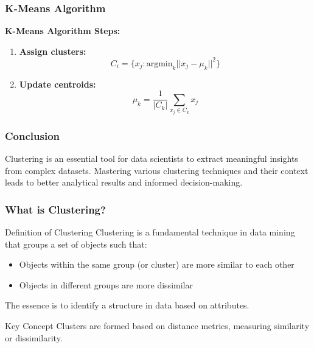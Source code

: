 \documentclass[aspectratio=169]{beamer}
\begin{document}
\begin{frame}[fragile]
    \frametitle{K-Means Algorithm}
    \textbf{K-Means Algorithm Steps:}
    \begin{enumerate}
        \item \textbf{Assign clusters:}
        \begin{equation}
            C_i = \{ x_j : \text{argmin}_{k} || x_j - \mu_k ||^2 \}
        \end{equation}
        \item \textbf{Update centroids:}
        \begin{equation}
            \mu_k = \frac{1}{|C_k|} \sum_{x_j \in C_k} x_j
        \end{equation}
    \end{enumerate}
\end{frame}

\begin{frame}[fragile]
    \frametitle{Conclusion}
    Clustering is an essential tool for data scientists to extract meaningful insights from complex datasets. 
    Mastering various clustering techniques and their context leads to better analytical results and informed decision-making.
\end{frame}

\begin{frame}[fragile]
    \frametitle{What is Clustering?}
    \begin{block}{Definition of Clustering}
        Clustering is a fundamental technique in data mining that groups a set of objects such that:
        \begin{itemize}
            \item Objects within the same group (or cluster) are more similar to each other 
            \item Objects in different groups are more dissimilar
        \end{itemize}
        The essence is to identify a structure in data based on attributes.
    \end{block}
    \begin{block}{Key Concept}
        Clusters are formed based on distance metrics, measuring similarity or dissimilarity.
    \end{block}
\end{frame}
\end{document}
